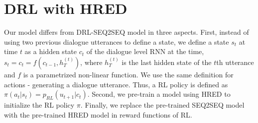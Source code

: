 \section{DRL with HRED}
Our model differs from DRL-SEQ2SEQ model in three aspects. First, instead of using two previous dialogue utterances to define a state, we define a state $s_t$ at time $t$ as a hidden state $c_t$ of the dialogue level RNN at the time, $s_t=c_t = f(c_{t-1},h_T^{(t)})$, where $h_T^{(t)}$ is the last hidden state of the $t$th utterance and $f$ is a parametrized non-linear function. We use the same definition for actions - generating a dialogue utterance. Thus, a RL policy is defined as $\pi(a_t|s_t) =p_{RL}(u_{t+1}|c_t)$. Second, we pre-train a model using HRED to initialize the RL policy $\pi$. Finally, we replace the pre-trained SEQ2SEQ model with the pre-trained HRED model in reward functions of RL. 